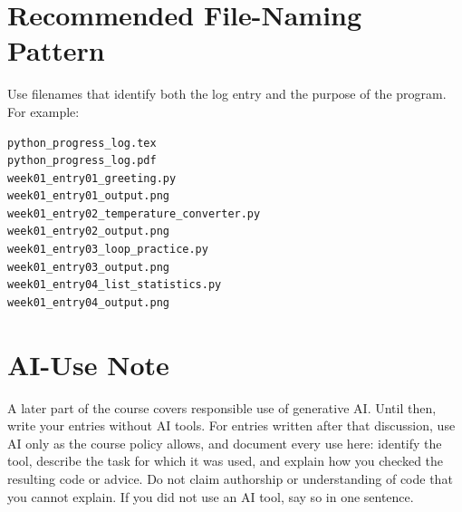 \documentclass[12pt]{article}
\begin{document}
\appendix
\section{Recommended File-Naming Pattern}
Use filenames that identify both the log entry and the purpose of the program. For example:
\begin{lstlisting}[language={},numbers=none]
python_progress_log.tex
python_progress_log.pdf
week01_entry01_greeting.py
week01_entry01_output.png
week01_entry02_temperature_converter.py
week01_entry02_output.png
week01_entry03_loop_practice.py
week01_entry03_output.png
week01_entry04_list_statistics.py
week01_entry04_output.png
\end{lstlisting}

\section{AI-Use Note}
A later part of the course covers responsible use of generative AI. Until then, write your entries without AI tools. For entries written after that discussion, use AI only as the course policy allows, and document every use here: identify the tool, describe the task for which it was used, and explain how you checked the resulting code or advice. Do not claim authorship or understanding of code that you cannot explain. If you did not use an AI tool, say so in one sentence.
\end{document}
